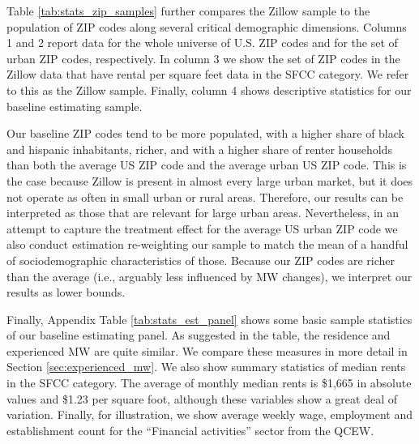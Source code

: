 Table \ref{tab:stats_zip_samples} further compares the Zillow sample to the 
population of ZIP codes along several critical demographic dimensions. Columns 1 
and 2 report data for the whole universe of U.S. ZIP codes and for the set of urban ZIP 
codes, respectively. In column 3 we show the set of ZIP codes in the Zillow data that have 
rental per square feet data in the SFCC category. We refer to this as the Zillow sample. 
Finally, column 4 shows descriptive statistics for our baseline estimating sample.

Our baseline ZIP codes tend to be more populated, with a higher share of black and hispanic
inhabitants, richer, and with a higher share of renter households than both the average US 
ZIP code and the average urban US ZIP code. This is the case because Zillow is present in 
almost every large urban market, but it does not operate as often in small urban or
rural areas. Therefore, our results can be interpreted as those that are relevant for 
large urban areas. Nevertheless, in an attempt to capture the treatment effect for 
the average US urban ZIP code we also conduct estimation re-weighting our sample to match 
the mean of a handful of sociodemographic characteristics of those. Because our ZIP codes 
are richer than the average (i.e., arguably less influenced by MW changes), we interpret 
our results as lower bounds.  

Finally, Appendix Table \ref{tab:stats_est_panel} shows some basic sample statistics of our 
baseline estimating panel. As suggested in the table, the residence and experienced MW 
are quite similar. We compare these measures in more detail in Section \ref{sec:experienced_mw}.
We also show summary statistics of median rents in the SFCC category. The average of 
monthly median rents is \$1,665 in absolute values and \$1.23 per square foot, although 
these variables show a great deal of variation. Finally, for illustration, we show average 
weekly wage, employment and establishment count for the ``Financial activities'' sector 
from the QCEW.